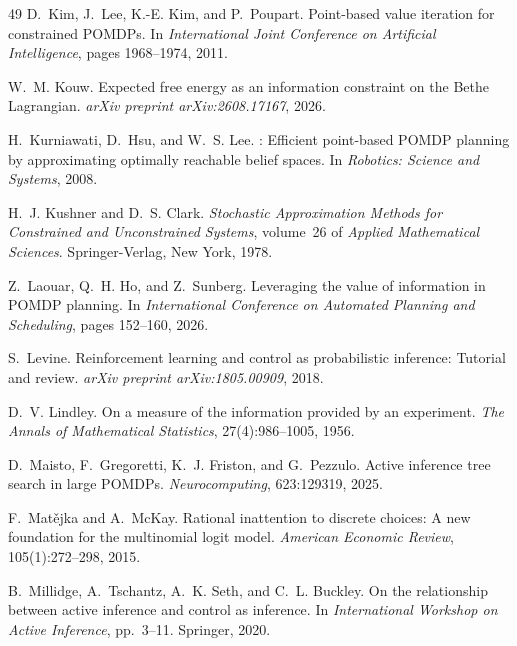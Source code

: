 \documentclass[runningheads]{llncs}
\begin{document}
\begin{thebibliography}{49}
D.~Kim, J.~Lee, K.-E. Kim, and P.~Poupart.
\newblock Point-based value iteration for constrained {POMDP}s.
\newblock In \emph{International Joint Conference on Artificial Intelligence}, pages 1968--1974, 2011.

W.~M. Kouw.
\newblock Expected free energy as an information constraint on the {B}ethe {L}agrangian.
\newblock \emph{arXiv preprint arXiv:2608.17167}, 2026.

H.~Kurniawati, D.~Hsu, and W.~S. Lee.
: Efficient point-based {POMDP} planning by approximating optimally reachable belief spaces.
\newblock In \emph{Robotics: Science and Systems}, 2008.

H.~J. Kushner and D.~S. Clark.
\newblock \emph{Stochastic Approximation Methods for Constrained and
  Unconstrained Systems}, volume~26 of \emph{Applied Mathematical Sciences}.
\newblock Springer-Verlag, New York, 1978.

Z.~Laouar, Q.~H. Ho, and Z.~Sunberg.
\newblock Leveraging the value of information in {POMDP} planning.
\newblock In \emph{International Conference on Automated Planning and Scheduling}, pages 152--160, 2026.

S.~Levine.
\newblock Reinforcement learning and control as probabilistic inference: Tutorial and review.
\newblock \emph{arXiv preprint arXiv:1805.00909}, 2018.

D.~V. Lindley.
\newblock On a measure of the information provided by an experiment.
\newblock \emph{The Annals of Mathematical Statistics}, 27(4):986--1005, 1956.

D.~Maisto, F.~Gregoretti, K.~J. Friston, and G.~Pezzulo.
\newblock Active inference tree search in large {POMDP}s.
\newblock \emph{Neurocomputing}, 623:129319, 2025.

F.~Mat\v{e}jka and A.~McKay.
\newblock Rational inattention to discrete choices: A new foundation for the multinomial logit model.
\newblock \emph{American Economic Review}, 105(1):272--298, 2015.

B.~Millidge, A.~Tschantz, A.~K. Seth, and C.~L. Buckley.
\newblock On the relationship between active inference and control as inference.
\newblock In \emph{International Workshop on Active Inference}, pp.\ 3--11. Springer, 2020.


\end{thebibliography}
\end{document}
